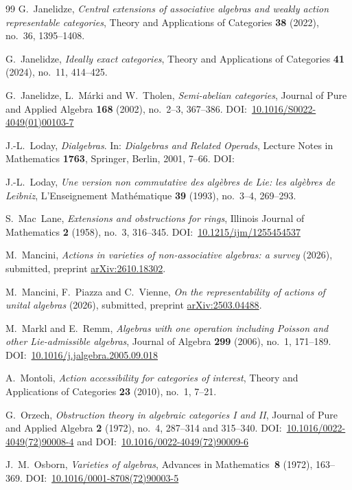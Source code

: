 \documentclass[reqno,a4paper]{amsart}
\renewcommand{\doi}[1]{DOI:~\href{https://doi.org/#1}{#1}}
\theoremstyle{plain}
\theoremstyle{definition}
\theoremstyle{remark}
\numberwithin{equation}{section}
\begin{document}
\begin{thebibliography}{99}
G.~Janelidze, \emph{Central extensions of associative algebras and weakly action representable categories}, Theory and Applications of Categories \textbf{38} (2022), no.~36, 1395--1408.

G.~Janelidze, \emph{Ideally exact categories}, Theory and Applications of Categories \textbf{41} (2024), no.~11, 414--425.

G.~Janelidze, L.~Márki and W.~Tholen, \emph{Semi-abelian categories}, Journal of Pure and Applied Algebra \textbf{168} (2002), no.~2--3, 367--386. \doi{10.1016/S0022-4049(01)00103-7}

J.-L.~Loday, \emph{Dialgebras}. In: \emph{Dialgebras and Related Operads}, Lecture Notes in Mathematics \textbf{1763}, Springer, Berlin, 2001, 7--66. \doi{}

J.-L.~Loday, \emph{Une version non commutative des algèbres de Lie: les algèbres de Leibniz}, L'Enseignement Math\'ematique \textbf{39} (1993), no.~3--4, 269--293.

S.~Mac~Lane, \emph{Extensions and obstructions for rings}, Illinois Journal of Mathematics \textbf{2} (1958), no.~3, 316--345. \doi{10.1215/ijm/1255454537}

M.~Mancini, \emph{Actions in varieties of non-associative algebras: a survey} (2026), submitted, preprint \href{https://arxiv.org/abs/2610.18302}{arXiv:2610.18302}.

M.~Mancini, F.~Piazza and C.~Vienne, \emph{On the representability of actions of unital algebras} (2026), submitted, preprint \href{https://arxiv.org/abs/2503.04488}{arXiv:2503.04488}.

M.~Markl and E.~Remm, \emph{Algebras with one operation including Poisson and other Lie-admissible algebras}, Journal of Algebra \textbf{299} (2006), no.~1, 171--189. \doi{10.1016/j.jalgebra.2005.09.018}

A.~Montoli, \emph{Action accessibility for categories of interest}, Theory and Applications of Categories \textbf{23} (2010), no.~1, 7--21.

G.~Orzech, \emph{Obstruction theory in algebraic categories {I} and {II}}, Journal of Pure and Applied Algebra \textbf{2} (1972), no.~4, 287--314 and 315--340. \doi{10.1016/0022-4049(72)90008-4} and \doi{10.1016/0022-4049(72)90009-6}

J.~M.~Osborn, \emph{Varieties of algebras}, Advances in Mathematics~\textbf{8} (1972), 163--369. \doi{10.1016/0001-8708(72)90003-5}


\end{thebibliography}
\end{document}
